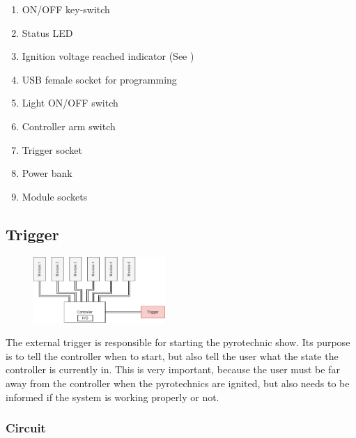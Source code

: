 \begin{enumerate}
	\item ON/OFF key-switch
	\item Status LED 
	\item Ignition voltage reached indicator (See )
	\item USB female socket for programming
	\item Light ON/OFF switch
	\item Controller arm switch
	\item Trigger socket
	\item Power bank
	\item Module sockets
\end{enumerate}

\pagebreak

\subsection{Trigger}

\begin{figure}[!ht]
    \centering
    \includegraphics[width=5cm]{./Figures/concept_trigger.png} 
\end{figure}

\noindent The external trigger is responsible for starting the pyrotechnic show. Its purpose is to tell the controller when to start, but also tell the user what the state the controller is currently in. This is very important, because the user must be far away from the controller when the pyrotechnics are ignited, but also needs to be informed if the system is working properly or not.

\subsubsection{Circuit}

